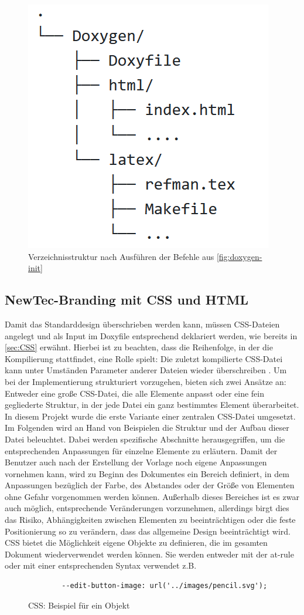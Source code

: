 \documentclass[11pt,a4paper]{report}
\begin{document}
\begin{figure}[h]
    \centering
    \includegraphics[height=0.35 \textwidth]{images/Tree_view.png}
    \caption{Verzeichnisstruktur nach Ausführen der Befehle aus \ref{fig:doxygen-init}}
    \label{fig:File_Tree}
\end{figure}

\subsection{NewTec-Branding mit CSS und HTML}

Damit das Standarddesign überschrieben werden kann, müssen CSS-Dateien angelegt und als Input im Doxyfile entsprechend deklariert werden, wie bereits in \ref{sec:CSS} erwähnt. Hierbei ist zu beachten, dass die Reihenfolge, in der die Kompilierung stattfindet, eine Rolle spielt: Die zuletzt kompilierte CSS-Datei kann unter Umständen Parameter anderer Dateien wieder überschreiben \cite{CSS_Tutorial}. Um bei der Implementierung strukturiert vorzugehen, bieten sich zwei Ansätze an: Entweder eine große CSS-Datei, die alle Elemente anpasst oder eine fein gegliederte Struktur, in der jede Datei ein ganz bestimmtes Element überarbeitet. In diesem Projekt wurde die erste Variante einer zentralen CSS-Datei umgesetzt. Im Folgenden wird an Hand von Beispielen die Struktur und der Aufbau dieser Datei beleuchtet. Dabei werden spezifische Abschnitte herausgegriffen, um die entsprechenden Anpassungen für einzelne Elemente zu erläutern.
Damit der Benutzer auch nach der Erstellung der Vorlage noch eigene Anpassungen vornehmen kann, wird zu Beginn des Dokumentes ein Bereich definiert, in dem Anpassungen bezüglich der Farbe, des Abstandes oder der Größe von Elementen ohne Gefahr vorgenommen werden können. Außerhalb dieses Bereiches ist es zwar auch möglich, entsprechende Veränderungen vorzunehmen, allerdings birgt dies das Risiko, Abhängigkeiten zwischen Elementen zu beeinträchtigen oder die feste Positionierung so zu verändern, dass das allgemeine Design beeinträchtigt wird. CSS bietet die Möglichkeit eigene Objekte zu definieren, die im gesamten Dokument wiederverwendet werden können. Sie werden entweder mit der \glqq at-rule \grqq{} oder mit einer entsprechenden Syntax verwendet \cite{CSS_Properties} z.B.
\begin{figure}[h]
\centering
\begin{verbatim}
        --edit-button-image: url('../images/pencil.svg');  
\end{verbatim} 
\caption{CSS: Beispiel für ein Objekt}
\label{code:CSS_Example}
\end{figure}
\end{document}
